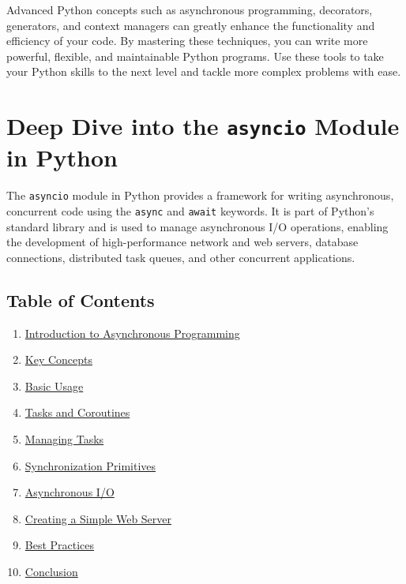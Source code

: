 \documentclass[
  letterpaper,
  DIV=11,
  numbers=noendperiod]{scrreprt}
\providecommand{\tightlist}{%
  \setlength{\itemsep}{0pt}\setlength{\parskip}{0pt}}\usepackage{longtable,booktabs,array}
\begin{document}
Advanced Python concepts such as asynchronous programming, decorators,
generators, and context managers can greatly enhance the functionality
and efficiency of your code. By mastering these techniques, you can
write more powerful, flexible, and maintainable Python programs. Use
these tools to take your Python skills to the next level and tackle more
complex problems with ease.


\chapter{\texorpdfstring{Deep Dive into the \texttt{asyncio} Module in
Python}{Deep Dive into the asyncio Module in Python}}\label{deep-dive-into-the-asyncio-module-in-python}

The \texttt{asyncio} module in Python provides a framework for writing
asynchronous, concurrent code using the \texttt{async} and
\texttt{await} keywords. It is part of Python's standard library and is
used to manage asynchronous I/O operations, enabling the development of
high-performance network and web servers, database connections,
distributed task queues, and other concurrent applications.

\section{Table of Contents}\label{table-of-contents-10}

\begin{enumerate}
\def\labelenumi{\arabic{enumi}.}
\tightlist
\item
  \hyperref[introduction-to-asynchronous-programming]{Introduction to
  Asynchronous Programming}
\item
  \hyperref[key-concepts]{Key Concepts}
\item
  \hyperref[basic-usage]{Basic Usage}
\item
  \hyperref[tasks-and-coroutines]{Tasks and Coroutines}
\item
  \hyperref[managing-tasks]{Managing Tasks}
\item
  \hyperref[synchronization-primitives]{Synchronization Primitives}
\item
  \hyperref[asynchronous-io]{Asynchronous I/O}
\item
  \hyperref[creating-a-simple-web-server]{Creating a Simple Web Server}
\item
  \hyperref[best-practices]{Best Practices}
\item
  \hyperref[conclusion]{Conclusion}
\end{enumerate}
\end{document}
